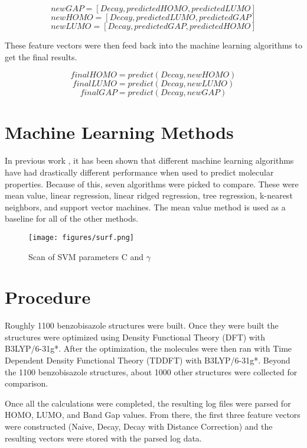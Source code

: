 \documentclass[10pt]{article}
\begin{document}
$$ newGAP = [Decay, predictedHOMO, predictedLUMO] $$
$$ newHOMO = [Decay, predictedLUMO, predictedGAP] $$
$$ newLUMO = [Decay, predictedGAP, predictedHOMO] $$

These feature vectors were then feed back into the machine learning algorithms to get the final results.

$$ finalHOMO = predict(Decay, newHOMO) $$
$$ finalLUMO = predict(Decay, newLUMO) $$
$$ finalGAP = predict(Decay, newGAP) $$

\section{Machine Learning Methods}

In previous work \cite{montavon_machine_2013}, it has been shown that different machine learning algorithms have had drastically different performance when used to predict molecular properties. Because of this, seven algorithms were picked to compare. These were mean value, linear regression, linear ridged regression, tree regression, k-nearest neighbors, and support vector machines. The mean value method is used as a baseline for all of the other methods.

 \begin{figure}[H]
   \begin{center}
     \texttt{[image: figures/surf.png]}
   \end{center}
   \caption{Scan of SVM parameters C and $\gamma$}
   \label{fig:scan}
 \end{figure}

\section{Procedure}

Roughly 1100 benzobisazole structures were built. Once they were built the structures were optimized using Density Functional Theory (DFT) with B3LYP/6-31g*. After the optimization, the molecules were then ran with Time Dependent Density Functional Theory (TDDFT) with B3LYP/6-31g*. Beyond the 1100 benzobisazole structures, about 1000 other structures were collected for comparison.

Once all the calculations were completed, the resulting log files were parsed for HOMO, LUMO, and Band Gap values. From there, the first three feature vectors were constructed (Naive, Decay, Decay with Distance Correction) and the resulting vectors were stored with the parsed log data.
\end{document}
